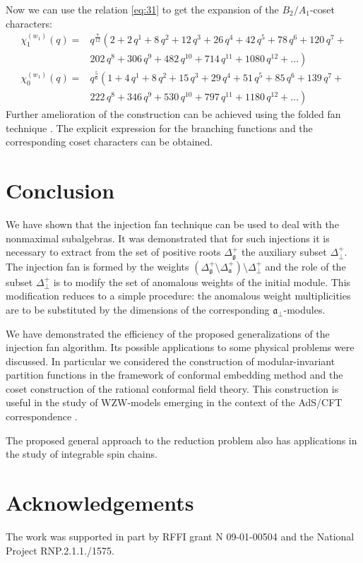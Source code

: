\documentclass[a4paper,12pt]{article}
\theoremstyle{definition} \newtheorem{Def}{Definition}
\begin{document}
Now we can use the relation \eqref{eq:31} to get the expansion of the $B_2/A_1$-coset characters:
\begin{equation}
  \label{eq:35}
  \begin{array}{cc}
    \chi^{(w_1)}_{1}(q)= & q^{\frac{7}{12}}\left( 2+2\,q^{1}+8\,q^{2}+12\,q^{3}+26\,q^{4}+42\,q^{5}+78\,q^{6}+120\,q^{7}+\right. \\
    & \left. 202\,q^{8}+306\,q^{9}+482\,q^{10}+714\,q^{11}+1080\,q^{12}+\dots \right)\\
    \chi^{(w_1)}_{0}(q) = & q^{\frac{5}{6}}\left(1 + 4\,q^{1}+ 8\,q^{2}+ 15\,q^{3}+ 29\,q^{4}+ 51\,q^{5}+ 85\,q^{6}+ 139\,q^{7}+\right. \\
    &\left. 222\,q^{8}+ 346\,q^{9}+ 530\,q^{10}+ 797\,q^{11}+ 1180\,q^{12}+\dots\right)
  \end{array}
\end{equation}
Further amelioration of the construction can be achieved using the folded fan technique \cite{il2010folded}. The explicit expression for the branching functions and the corresponding coset characters can be obtained.

\section{Conclusion}
\label{sec:conclusion}
We have shown that the injection fan technique can be used to deal with the nonmaximal subalgebras. It was demonstrated that for such injections it is necessary to extract from the set of positive roots $\Delta_{\mathfrak{g}}^{+}$ the auxiliary subset $\Delta^{+}_{\bot}$. The injection fan is formed by the weights $\left(\Delta_{\mathfrak{g}}^{+} \setminus  \Delta_{\mathfrak{a}}^{+}\right) \setminus \Delta^{+}_{\bot}$ and the role of the subset $\Delta^{+}_{\bot}$ is to modify the set of anomalous weights of the initial module. This modification reduces to a simple procedure: the anomalous weight multiplicities are to be substituted by the dimensions of the corresponding ${\mathfrak{a}}_{\bot}$-modules.      
 
We have demonstrated the efficiency of the proposed generalizations of the injection fan algorithm. Its possible applications to some physical problems were discussed. In particular we considered the construction of modular-invariant partition functions  in the framework of conformal embedding method and the coset construction of the rational conformal field theory. This construction is useful in the study of WZW-models emerging in the context of the AdS/CFT correspondence \cite{Maldacena:2000hw,Maldacena:2000kv,Maldacena:2001km}.

The proposed general approach to the reduction problem also has applications in the study of integrable spin chains.

\section{Acknowledgements}
The work was supported in
part by RFFI grant N 09-01-00504 and the National Project RNP.2.1.1./1575.

{}

\end{document}
